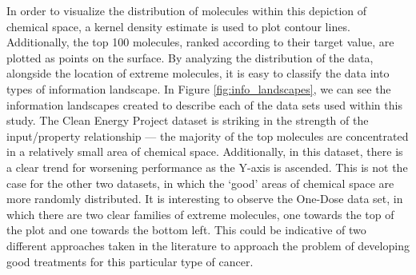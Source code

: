 In order to visualize the distribution
of molecules within this depiction of chemical space, a kernel density estimate
is used to plot contour lines.  Additionally, the top 100 molecules, ranked
according to their target value, are plotted as points on the surface.  By
analyzing the distribution of the data, alongside the location of extreme
molecules, it is easy to classify the data into types of information landscape.
In Figure \ref{fig:info_landscapes}, we can see the information landscapes
created to describe each of the data sets used within this study.  The Clean
Energy Project dataset is striking in the strength of the input/property
relationship --- the majority of the top molecules are concentrated in a
relatively small area of chemical space.  Additionally, in this dataset, there
is a clear trend for worsening performance as the Y-axis is ascended.  This is
not the case for the other two datasets, in which the `good' areas of chemical
space are more randomly distributed.  It is interesting to observe the One-Dose
data set, in which there are two clear families of extreme molecules, one
towards the top of the plot and one towards the bottom left.  This could be
indicative of two different approaches taken in the literature to approach the
problem of developing good treatments for this particular type of cancer.


